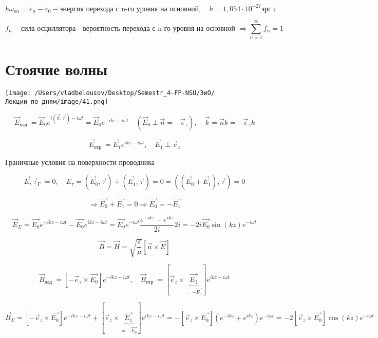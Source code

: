 \documentclass[12pt, a4paper]{report}
\begin{document}
\[ h \omega _{on     } = \varepsilon_n -\varepsilon_0 - \text{энергия перехода с n-го уровня на основной} ,\quad  h = 1,054 \cdot 10 ^{-27} \text{эрг с }    \]  

\[ f_n - \text{сила осциллятора - вероятность перехода с n-го уровня на основной  } \Rightarrow \sum_{n =1} ^{\infty  } f_n = 1   \] 

\section{Стоячие волны}

\begin{center}
    \texttt{[image: /Users/vladbelousov/Desktop/Semestr\_4-FP-NSU/ЭиО/Лекции\_по\_дням/image/41.png]}
\end{center}

\[ \vec{E } _{\text{пад } } =   \vec{E }  _ 0 e^{i (\vec{k},\vec{r }     )- i \omega t }  = \vec{E } _0 e^{- i k z - i \omega t } \quad ( \vec{E } _0 \perp \vec{n }  = - \vec{e } _z ), \quad \vec{k } = \vec{n } k = - \vec{e }_z k\] 

\[ \vec{E } _{\text{отр }  } = \vec{E } _1 e^{i kz - i \omega t }, \quad  \vec{E } _1 \perp \vec{e }_z     \] 

Граничные условия на поверхности проводника

\[ \vec{E } , \vec{\tau }_{\text{Г } } = 0 , \quad E_{\tau } =( \vec{E } _ 0 ,\vec{\tau } )+ ( \vec{E } _ 1 , \vec{\tau } ) = 0 = ((\vec{E } _0 + \vec{E } _1), \vec{\tau } )= 0      \] 

\[ \Rightarrow \vec{E_0} + \vec{E_1 } = 0 \Rightarrow \vec{E_0 } = -\vec{E_1}      \] 

\[ \vec{E}_{\Sigma } = \vec{E_0 }e^{ - i kz - i\omega t}  - \vec{E_0 }e^{i kz - i \omega t } = \vec{E_0 }e^{- i \omega t } \frac{ e^{- ikz } - e^{i kz } }{2i } 2 i= -2i \vec{E_0 }\sin (kz) e^{- i \omega t }          \] 

\[ \vec{B }  = \vec{H }  = \sqrt{\frac{ \varepsilon }{\mu } } [ \vec{n } \times  \vec{E } ]  \]

\[ \vec{B }_{\text{пад } } = [ - \vec{e } _z \times  \vec{E_0}  ]   e^{- ikz - i \omega t } , \quad  \vec{B }_{\text{отр } } = [  \vec{e } _z \times  \underbrace{\vec{E_1 }}_{= - \vec{E_0} } ] e^{ikz - i \omega t } \] 

\[ \vec{B}_{\Sigma} = [ -\vec{ e }  _z \times  \vec{E_0 } ] e^{-i k z - i \omega t}  +[ \vec{ e }  _z \times  \underbrace{\vec{E_1 }}_{=-\vec{E_0} } ] e^{i k z - i \omega t} =-[\vec{e } _z \times  \vec{E_0 } ](e^{-i k z } +e^{i k z } )e^{- i \omega t } = -2 [\vec{e } _z \times  \vec{E_0 }] \cos (kz ) e^{- i \omega t }      \] 
\end{document}
